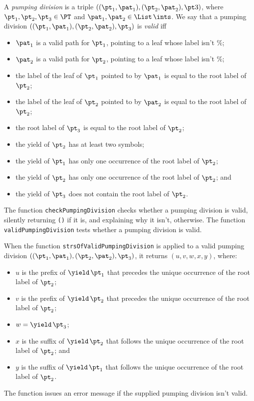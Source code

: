A \emph{pumping division} is a triple $((\pt_1, \pat_1), (\pt_2,
\pat_2), \pt3)$, where $\pt_1, \pt_2, \pt_3\in\PT$ and $\pat_1,
\pat_2\in\List\,\ints$.  We say that a pumping division $((\pt_1,
\pat_1), (\pt_2, \pat_2), \pt_3)$ is \emph{valid} iff
\begin{itemize}
\item $\pat_1$ is a valid path for $\pt_1$, pointing to a leaf whose
  label isn't $\%$;

\item $\pat_2$ is a valid path for $\pt_2$, pointing to a leaf whose
  label isn't $\%$;

\item the label of the leaf of $\pt_1$ pointed to by $\pat_1$ is equal
  to the root label of $\pt_2$;

\item the label of the leaf of $\pt_2$ pointed to by $\pat_2$ is equal
  to the root label of $\pt_2$;

\item the root label of $\pt_3$ is equal to the root label of $\pt_2$;

\item the yield of $\pt_2$ has at least two symbols;

\item the yield of $\pt_1$ has only one occurrence of the root label
  of $\pt_2$;

\item the yield of $\pt_2$ has only one occurrence of the root label
  of $\pt_2$; and

\item the yield of $\pt_3$ does not contain the root label of $\pt_2$.
\end{itemize}
The function \texttt{checkPumpingDivision} checks whether a pumping division
is valid, silently returning \texttt{()} if it is, and explaining why
it isn't, otherwise.  The function \texttt{validPumpingDivision} tests
whether a pumping division is valid.

When the function \texttt{strsOfValidPumpingDivision} is applied to a
valid pumping division $((\pt_1, \pat_1), (\pt_2, \pat_2), \pt_3)$, it
returns $(u, v, w, x, y)$, where:
\begin{itemize}
\item $u$ is the prefix of $\yield\,\pt_1$ that precedes the unique
  occurrence of the root label of $\pt_2$;

\item $v$ is the prefix of $\yield\,\pt_2$ that precedes the unique
  occurrence of the root label of $\pt_2$;

\item $w = \yield\,\pt_3$;

\item $x$ is the suffix of $\yield\,\pt_2$ that follows the unique
  occurrence of the root label of $\pt_2$; and

\item $y$ is the suffix of $\yield\,\pt_1$ that follows the unique
  occurrence of the root label of $\pt_2$.
\end{itemize}
The function issues an error message if the supplied pumping division
isn't valid.


